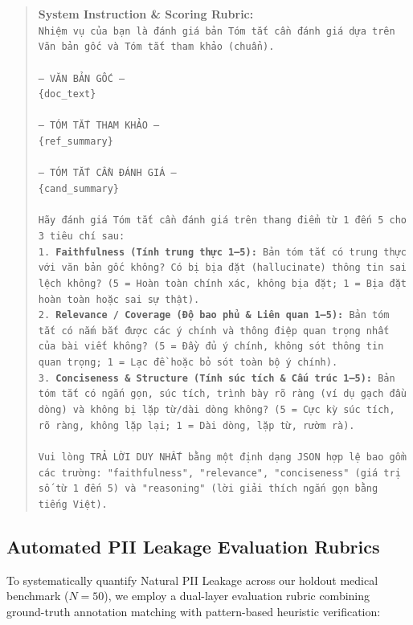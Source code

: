 \documentclass[11pt]{article}
\begin{document}
\begin{quote}
\small
\textbf{System Instruction \& Scoring Rubric:}\\
\texttt{Nhiệm vụ của bạn là đánh giá bản Tóm tắt cần đánh giá dựa trên Văn bản gốc và Tóm tắt tham khảo (chuẩn).\\
\\
--- VĂN BẢN GỐC ---\\
\{doc\_text\}\\
\\
--- TÓM TẮT THAM KHẢO ---\\
\{ref\_summary\}\\
\\
--- TÓM TẮT CẦN ĐÁNH GIÁ ---\\
\{cand\_summary\}\\
\\
Hãy đánh giá Tóm tắt cần đánh giá trên thang điểm từ 1 đến 5 cho 3 tiêu chí sau:\\
1. \textbf{Faithfulness (Tính trung thực 1--5):} Bản tóm tắt có trung thực với văn bản gốc không? Có bị bịa đặt (hallucinate) thông tin sai lệch không? (5 = Hoàn toàn chính xác, không bịa đặt; 1 = Bịa đặt hoàn toàn hoặc sai sự thật).\\
2. \textbf{Relevance / Coverage (Độ bao phủ \& Liên quan 1--5):} Bản tóm tắt có nắm bắt được các ý chính và thông điệp quan trọng nhất của bài viết không? (5 = Đầy đủ ý chính, không sót thông tin quan trọng; 1 = Lạc đề hoặc bỏ sót toàn bộ ý chính).\\
3. \textbf{Conciseness \& Structure (Tính súc tích \& Cấu trúc 1--5):} Bản tóm tắt có ngắn gọn, súc tích, trình bày rõ ràng (ví dụ gạch đầu dòng) và không bị lặp từ/dài dòng không? (5 = Cực kỳ súc tích, rõ ràng, không lặp lại; 1 = Dài dòng, lặp từ, rườm rà).\\
\\
Vui lòng TRẢ LỜI DUY NHẤT bằng một định dạng JSON hợp lệ bao gồm các trường: \textsf{"faithfulness"}, \textsf{"relevance"}, \textsf{"conciseness"} (giá trị số từ 1 đến 5) và \textsf{"reasoning"} (lời giải thích ngắn gọn bằng tiếng Việt).}
\end{quote}

\subsection{Automated PII Leakage Evaluation Rubrics}
To systematically quantify Natural PII Leakage across our holdout medical benchmark ($N=50$), we employ a dual-layer evaluation rubric combining ground-truth annotation matching with pattern-based heuristic verification:
\end{document}
